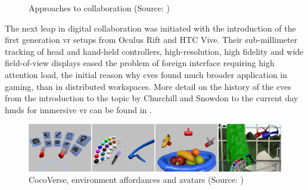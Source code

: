 \begin{figure}
	\centering
	\hfill
	\hfill
	\hfill
	\caption{Approaches to collaboration (Source: \cite{churchill_collaborative_1998})}
	\label{fig:approaches_to_collaboration}
\end{figure}

The next leap in digital collaboration was initiated with the introduction of the first generation \gls{vr} setups from Oculus Rift and HTC Vive. Their sub-millimeter tracking of head and hand-held controllers, high-resolution, high fidelity and wide field-of-view displays eased the problem of foreign interface  requiring high attention load, the initial reason why \gls{cve}s found much broader application in gaming, than in distributed workspaces. More detail on the history of the \gls{cve}s from the introduction to the topic by Churchill and Snowdon to the current day \gls{hmd}s for immersive \gls{vr} can be found in \cite{greenwald_technology_2017}.

\begin{figure}
	\centering
	\includegraphics[width=0.7\linewidth]{figures/Cocoverse}
	\caption{CocoVerse, environment affordances and avatars (Source: \cite{greenwald_cocoverse_nodate})}
	\label{fig:cocoverse}
\end{figure}

